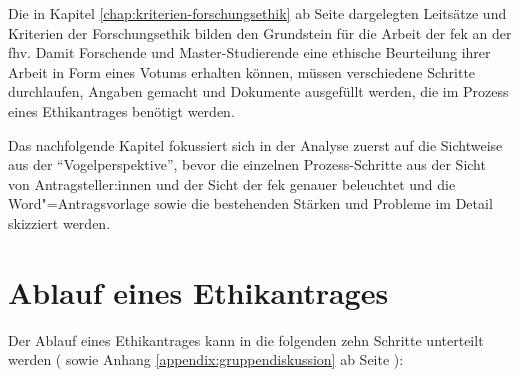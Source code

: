 \documentclass[a4paper,12pt,twoside]{scrreprt}
\begin{document}
Die in Kapitel \ref{chap:kriterien-forschungsethik} ab Seite \pageref{chap:kriterien-forschungsethik} dargelegten Leitsätze und Kriterien der Forschungsethik bilden den Grundstein für die Arbeit der \acl{fek} an der \acl{fhv}. Damit Forschende und Master-Studierende eine ethische Beurteilung ihrer Arbeit in Form eines Votums erhalten können, müssen verschiedene Schritte durchlaufen, Angaben gemacht und Dokumente ausgefüllt werden, die im Prozess eines Ethikantrages benötigt werden.

\medskip

Das nachfolgende Kapitel fokussiert sich in der Analyse zuerst auf die Sichtweise aus der \enquote{Vogelperspektive}, bevor die einzelnen Prozess-Schritte aus der Sicht von Antragsteller:innen und der Sicht der \ac{fek} genauer beleuchtet und die Word"=Antragsvorlage sowie die bestehenden Stärken und Probleme im Detail skizziert werden.

\section{Ablauf eines Ethikantrages}
\label{sec:ablauf-ethikantrag}

Der Ablauf eines Ethikantrages kann in die folgenden zehn Schritte unterteilt werden (\cite{fachhochschule_vorarlberg_gmbh_forschungsethik-kommission_2021, forschungsethik-kommission_der_fachhochschule_vorarlberg_verfahrensordnung_2020} sowie Anhang \ref{appendix:gruppendiskussion} ab Seite \pageref{appendix:gruppendiskussion}):
\end{document}

